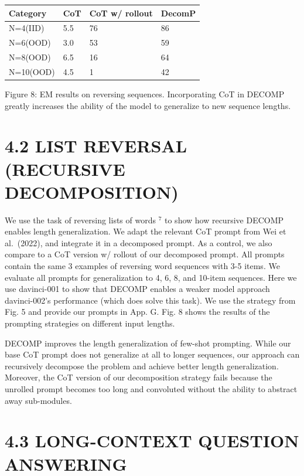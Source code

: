 \documentclass[
]{article}
\newcounter{none} %
\begin{document}
{\def\LTcaptype{none} %
\begin{longtable}[]{@{}llll@{}}
\toprule\noalign{}
Category & CoT & CoT w/ rollout & DecomP \\
\midrule\noalign{}
\endhead
\bottomrule\noalign{}
\endlastfoot
N=4(IID) & 5.5 & 76 & 86 \\
N=6(OOD) & 3.0 & 53 & 59 \\
N=8(OOD) & 6.5 & 16 & 64 \\
N=10(OOD) & 4.5 & 1 & 42 \\
\end{longtable}
}

Figure 8: EM results on reversing sequences. Incorporating CoT in DECOMP
greatly increases the ability of the model to generalize to new sequence
lengths.

\section{4.2 LIST REVERSAL (RECURSIVE
DECOMPOSITION)}\label{list-reversal-recursive-decomposition}

We use the task of reversing lists of words \(^{7}\) to show how
recursive DECOMP enables length generalization. We adapt the relevant
CoT prompt from Wei et al.~(2022), and integrate it in a decomposed
prompt. As a control, we also compare to a CoT version w/ rollout of our
decomposed prompt. All prompts contain the same 3 examples of reversing
word sequences with 3-5 items. We evaluate all prompts for
generalization to 4, 6, 8, and 10-item sequences. Here we use
davinci-001 to show that DECOMP enables a weaker model approach
davinci-002's performance (which does solve this task). We use the
strategy from Fig. 5 and provide our prompts in App. G. Fig. 8 shows the
results of the prompting strategies on different input lengths.

DECOMP improves the length generalization of few-shot prompting. While
our base CoT prompt does not generalize at all to longer sequences, our
approach can recursively decompose the problem and achieve better length
generalization. Moreover, the CoT version of our decomposition strategy
fails because the unrolled prompt becomes too long and convoluted
without the ability to abstract away sub-modules.

\section{4.3 LONG-CONTEXT QUESTION
ANSWERING}\label{long-context-question-answering}
\end{document}
